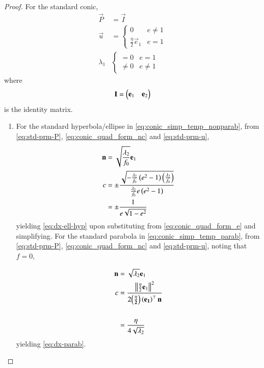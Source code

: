 \begin{enumerate}[label=\thesubsection.\arabic*.,ref=\thesubsection.\theenumi]
	\begin{proof}%
  \label{app:foc-dir}
		For the standard conic, 
				\begin{align}
					\label{eq:std-prm-P}
					\vec{P} &= \vec{I}
					\\
					\vec{u} &= 
				\begin{cases}
				0 & e \ne 1
       \\
				\frac{\eta}{2} \vec{e}_1 & e = 1
				\end{cases}
				\label{eq:std-prm-u}
				\\
				\lambda_1 &  
					\begin{cases}
						=0 & e = 1
						\\
						\ne 0 & e \ne 1
					\end{cases}
				\label{eq:std-prm-lam1}
				\end{align}
				where 
				\begin{align}
					\mathbf{I} = \begin{pmatrix}\mathbf{e}_1 & \mathbf{e}_2\end{pmatrix}
				\end{align}
				is the identity matrix.
%  
		\begin{enumerate}
			\item For the standard hyperbola/ellipse in \eqref{eq:conic_simp_temp_nonparab}, from 
					\eqref{eq:std-prm-P},
\eqref{eq:conic_quad_form_nc}
and 
					\eqref{eq:std-prm-u},
				\begin{align}
\label{eq:n-ell-hyp}
					\mathbf{n} &= \sqrt{\frac{\lambda_2}{f_0}} \mathbf{e}_1 
					\\
					c &= 
					\pm \frac{\sqrt{-\frac{\lambda_2}{f_0}\left(e^2-1\right)\left(\frac{\lambda_2}{ f_0}\right)}}{\frac{\lambda_2}{f_0}e\left(e^2-1\right)}
					\\
					&=\pm \frac{1}{e\sqrt{1-e^2}}
\label{eq:c-ell-hyp}
				\end{align}
				yielding 
					\eqref{eq:dx-ell-hyp} upon substituting from 
\eqref{eq:conic_quad_form_e} and simplifying.
For the standard parabola in \eqref{eq:conic_simp_temp_parab},  from 
					\eqref{eq:std-prm-P},
\eqref{eq:conic_quad_form_nc}
and 
					\eqref{eq:std-prm-u}, noting that $f = 0$,

				\begin{align}
\label{eq:n-parab}
					\mathbf{n} &= \sqrt{\lambda_2} \mathbf{e}_1 
					\\
					c &=
	\frac{\left\lVert\frac{\eta}{2} \mathbf{e}_1\right\rVert^2   }{2\mathbf{\left(\frac{\eta}{2}\right) \left(\mathbf{e}_1\right)^{\top}\mathbf{n}}} 
\\
					\\
					&= \frac{\eta}{4\sqrt{\lambda_2}}
\label{eq:c-parab}
				\end{align}
				yielding 
					\eqref{eq:dx-parab}.


\end{enumerate}
\end{proof}
\end{enumerate}
